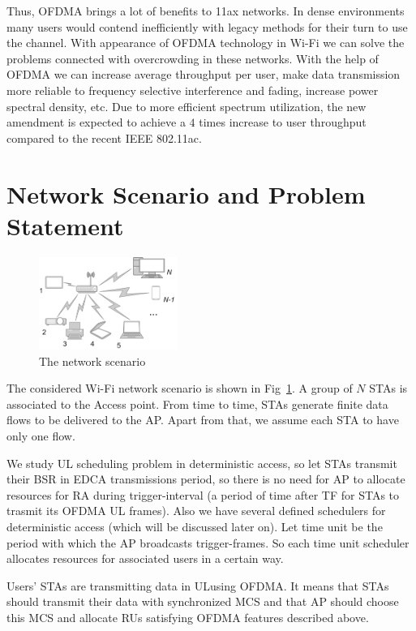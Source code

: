 Thus, OFDMA brings a lot of benefits to 11ax networks. In dense environments many users would contend inefficiently with legacy methods for their turn to use the channel. 
With appearance of OFDMA technology in Wi-Fi we can solve the problems connected with overcrowding in these networks.
With the help of OFDMA we can increase average throughput per user, make data transmission more reliable to frequency selective interference and fading, increase power spectral density, etc. Due to more efficient spectrum utilization, the new amendment is expected to achieve a $4$ times increase to user throughput compared to the recent IEEE 802.11ac.

\section{Network Scenario and Problem Statement}
\label{sec:scenario}

\begin{figure}[t]
	\includegraphics[width = 0.4\textwidth]{NetworkScenario}
	\caption{\label{fig:scenario} The network scenario}
\end{figure}

The considered Wi-Fi network scenario is shown in Fig~\ref{fig:scenario}. A group of $N$ STAs is associated to the Access point. 
From time to time, STAs generate finite data flows to be delivered to the AP. Apart from that, we assume each STA to have only one flow.

We study UL scheduling problem in deterministic access, so let STAs transmit their BSR in EDCA transmissions period, so there is no need for AP to allocate resources for RA during trigger-interval (a period of time after TF for STAs to trasmit its OFDMA UL frames).
Also we have several defined schedulers for deterministic access (which will be discussed later on). 
Let time unit be the period with which the AP broadcasts trigger-frames.
So each time unit scheduler allocates resources for associated users in a certain way.

Users' STAs are transmitting data in ULusing OFDMA. 
It means that STAs should transmit their data with synchronized MCS and that AP should choose this MCS and allocate RUs \textcolor{prpl}{satisfying OFDMA features} described above. 

